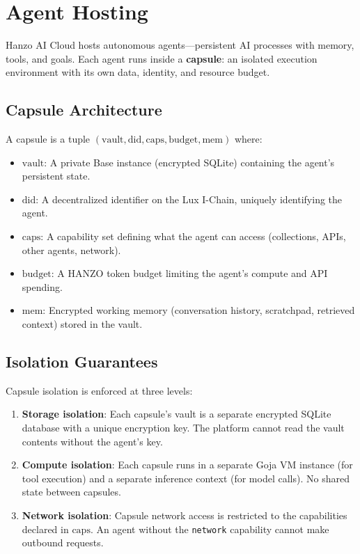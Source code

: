\section{Agent Hosting}

\label{sec:agents}

Hanzo AI Cloud hosts autonomous agents---persistent AI processes with memory,
tools, and goals. Each agent runs inside a \textbf{capsule}: an isolated
execution environment with its own data, identity, and resource budget.

\subsection{Capsule Architecture}

\begin{definition}
A capsule is a tuple $(\text{vault}, \text{did}, \text{caps}, \text{budget},
\text{mem})$ where:
\begin{itemize}[leftmargin=1.1em]
    \item $\text{vault}$: A private Base instance (encrypted SQLite) containing
    the agent's persistent state.
    \item $\text{did}$: A decentralized identifier on the Lux I-Chain,
    uniquely identifying the agent.
    \item $\text{caps}$: A capability set defining what the agent can access
    (collections, APIs, other agents, network).
    \item $\text{budget}$: A HANZO token budget limiting the agent's compute
    and API spending.
    \item $\text{mem}$: Encrypted working memory (conversation history,
    scratchpad, retrieved context) stored in the vault.
\end{itemize}
\end{definition}

\subsection{Isolation Guarantees}

Capsule isolation is enforced at three levels:

\begin{enumerate}[leftmargin=1.4em]
    \item \textbf{Storage isolation}: Each capsule's vault is a separate
    encrypted SQLite database with a unique encryption key. The platform
    cannot read the vault contents without the agent's key.
    \item \textbf{Compute isolation}: Each capsule runs in a separate Goja VM
    instance (for tool execution) and a separate inference context (for model
    calls). No shared state between capsules.
    \item \textbf{Network isolation}: Capsule network access is restricted to
    the capabilities declared in $\text{caps}$. An agent without the
    \texttt{network} capability cannot make outbound requests.
\end{enumerate}

